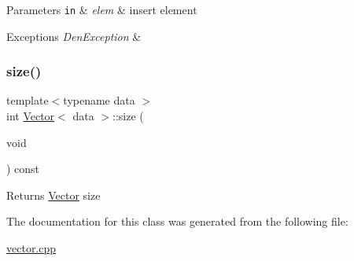 \begin{DoxyParams}[1]{Parameters}
\mbox{\tt in}  & {\em elem} & insert element \\
\hline
\end{DoxyParams}

\begin{DoxyExceptions}{Exceptions}
{\em Den\+Exception} & \\
\hline
\end{DoxyExceptions}
\mbox{\label{classVector_a81b1d973485244101caf8e901b4a03d9}} 
\subsubsection{\texorpdfstring{size()}{size()}}
{\footnotesize\ttfamily template$<$typename data $>$ \\
int \hyperlink{classVector}{Vector}$<$ data $>$\+::size (\begin{DoxyParamCaption}\item[{void}]{ }\end{DoxyParamCaption}) const}

\begin{DoxyReturn}{Returns}
\hyperlink{classVector}{Vector} size 
\end{DoxyReturn}


The documentation for this class was generated from the following file\+:\begin{DoxyCompactItemize}
\item 
\hyperlink{vector_8cpp}{vector.\+cpp}\end{DoxyCompactItemize}
